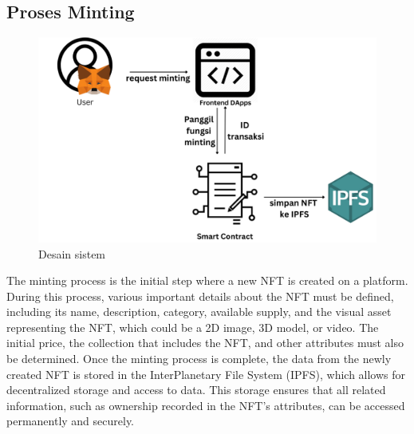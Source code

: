 
\subsection{Proses Minting}
\begin{figure}[H] \centering
  \includegraphics[scale=0.17]{gambar/proses_minting.png}
  \caption{Desain sistem}
  \label{fig:proses_minting}
\end{figure}

The minting process is the initial step where a new NFT is created on a platform. During this process, various important details about the NFT must be defined, including its name, description, category, available supply, and the visual asset representing the NFT, which could be a 2D image, 3D model, or video. The initial price, the collection that includes the NFT, and other attributes must also be determined. Once the minting process is complete, the data from the newly created NFT is stored in the InterPlanetary File System (IPFS), which allows for decentralized storage and access to data. This storage ensures that all related information, such as ownership recorded in the NFT’s attributes, can be accessed permanently and securely.

